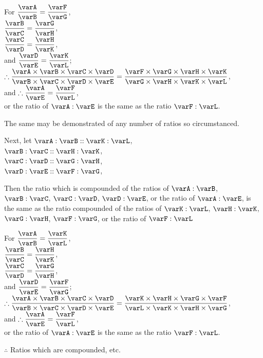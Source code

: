 \documentclass[booklanguage=english]{byrnebook}
\begin{document}
\begin{center}
For $\dfrac{\varA}{\varB} = \dfrac{\varF}{\varG}$,\\
$\dfrac{\varB}{\varC} = \dfrac{\varG}{\varH}$,\\
$\dfrac{\varC}{\varD} = \dfrac{\varH}{\varK}$,\\
and $\dfrac{\varD}{\varE} = \dfrac{\varK}{\varL}$;\\
$\therefore \dfrac{\varA \times \varB \times \varC \times \varD}{\varB \times \varC \times \varD \times \varE} = \dfrac{\varF \times \varG \times \varH \times \varK}{\varG \times \varH \times \varK \times \varL}$,\\
and $\therefore \dfrac{\varA}{\varE} = \dfrac{\varF}{\varL}$,\\
or the ratio of $\varA : \varE$ is the same as the ratio $\varF : \varL$.
\end{center}

The same may be demonstrated of any number of ratios so circumstanced.

\begin{center}
Next, let $\varA : \varB :: \varK : \varL$,\\
 $\varB : \varC :: \varH : \varK$,\\
$\varC : \varD :: \varG : \varH$,\\
$\varD : \varE :: \varF : \varG$,
\end{center}

Then the ratio which is compounded of the ratios of $\varA : \varB$, $\varB : \varC$, $\varC : \varD$, $\varD : \varE$, or the ratio of $\varA : \varE$, is the same as the ratio compounded of the ratios of $\varK : \varL$, $\varH : \varK$, $\varG : \varH$, $\varF : \varG$, or the ratio of $\varF : \varL$

\begin{center}
For $\dfrac{\varA}{\varB} = \dfrac{\varK}{\varL}$,\\
$\dfrac{\varB}{\varC} = \dfrac{\varH}{\varK}$,\\
$\dfrac{\varC}{\varD} = \dfrac{\varG}{\varH}$,\\
and $\dfrac{\varD}{\varE} = \dfrac{\varF}{\varG}$;\\
$\therefore \dfrac{\varA \times \varB \times \varC \times \varD}{\varB \times \varC \times \varD \times \varE} = \dfrac{\varK \times \varH \times \varG \times \varF}{\varL \times \varK \times \varH \times \varG}$,\\
and $\therefore \dfrac{\varA}{\varE} = \dfrac{\varF}{\varL}$,\\
or the ratio of $\varA : \varE$ is the same as the ratio $\varF : \varL$.

$\therefore$ Ratios which are compounded, etc.
\end{center}
\vfill\pagebreak
\end{document}
